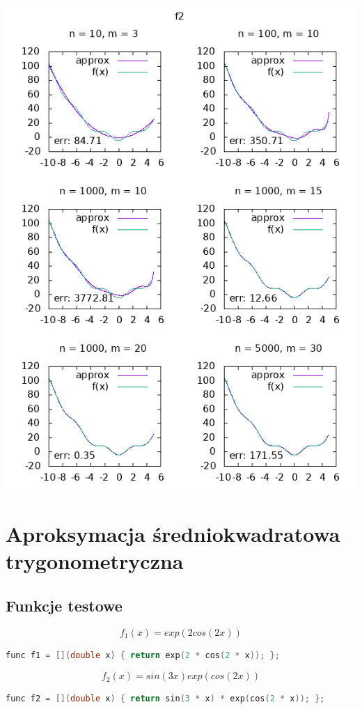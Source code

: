 \documentclass{article}
\begin{document}
\clearpage
\includegraphics{graphs/plot2.png}

\clearpage
\section{Aproksymacja średniokwadratowa trygonometryczna}

\subsection{Funkcje testowe}

\[f_1(x) = exp(2cos(2x))\]
\begin{lstlisting}[language=C++]
func f1 = [](double x) { return exp(2 * cos(2 * x)); };
\end{lstlisting}

\[f_2(x) = sin(3x)exp(cos(2x))\]
\begin{lstlisting}[language=C++]
func f2 = [](double x) { return sin(3 * x) * exp(cos(2 * x)); };
\end{lstlisting}
\end{document}
